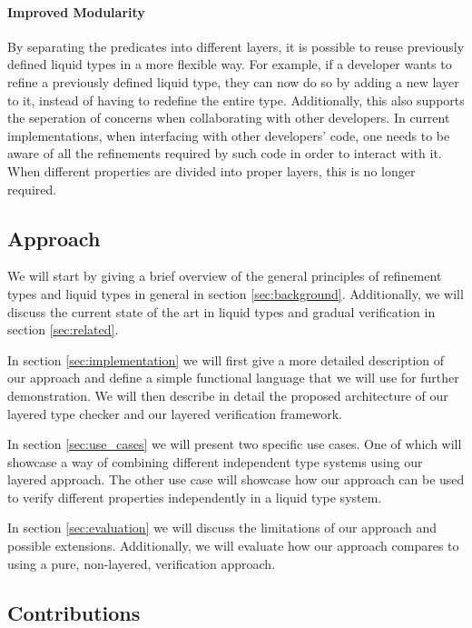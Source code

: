 \paragraph{Improved Modularity}

By separating the predicates into different layers, it is possible to reuse previously defined liquid types in a more flexible way. For example, if a developer wants to refine a previously defined liquid type, they can now do so by adding a new layer to it, instead of having to redefine the entire type. Additionally, this also supports the seperation of concerns when collaborating with other developers. In current implementations, when interfacing with other developers' code, one needs to be aware of all the refinements required by such code in order to interact with it. When different properties are divided into proper layers, this is no longer required.

\subsection{Approach}
\label{ssec:approach}

We will start by giving a brief overview of the general principles of refinement types and liquid types in general in section \ref{sec:background}. Additionally, we will discuss the current state of the art in liquid types and gradual verification in section \ref{sec:related}. 

In section \ref{sec:implementation} we will first give a more detailed description of our approach and define a simple functional language that we will use for further demonstration. We will then describe in detail the proposed architecture of our layered type checker and our layered verification framework.

In section \ref{sec:use_cases} we will present two specific use cases. One of which will showcase a way of combining different independent type systems using our layered approach. The other use case will showcase how our approach can be used to verify different properties independently in a liquid type system.

In section \ref{sec:evaluation} we will discuss the limitations of our approach and possible extensions. Additionally, we will evaluate how our approach compares to using a pure, non-layered, verification approach.

\subsection{Contributions}
\label{ssec:contributions}

